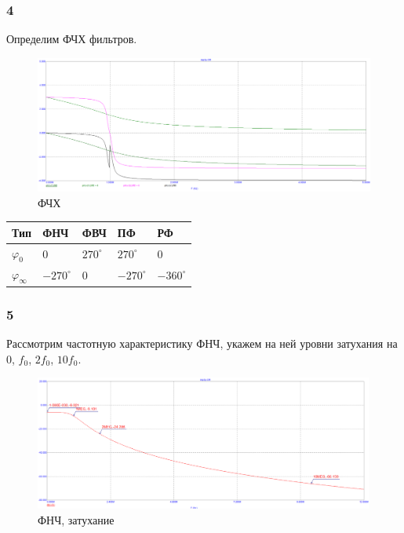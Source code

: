 \documentclass[12pt,a4paper]{article}
\begin{document}
	\subsubsection*{4}

	Определим ФЧХ фильтров.
	
	\begin{figure}[H]
		\centering
		\includegraphics[width=1.0\linewidth]{res/imp3p_phase.png}
		\caption{ФЧХ}
		\label{phase}
	\end{figure}

	\begin{table}[H]
		\begin{tabular}{lllll}
			\hline
			Тип                & ФНЧ             & ФВЧ            & ПФ              & РФ              \\ \hline
			$\varphi_0$        & $0$             & $270 ^{\circ}$ & $270 ^{\circ}$  & 0               \\
			$\varphi_{\infty}$ & $-270 ^{\circ}$ & 0              & $-270 ^{\circ}$ & $-360 ^{\circ}$ \\ \hline
		\end{tabular}
	\end{table}

	\subsubsection*{5}
	
	Рассмотрим частотную характеристику ФНЧ, укажем на ней уровни затухания на $0$, $f_0$, $2f_0$, $10f_0$.

	\begin{figure}[H]
		\centering
		\includegraphics[width=1.0\linewidth]{res/imp3p_low_log.png}
		\caption{ФНЧ, затухание}
		\label{phase}
	\end{figure}
\end{document}
